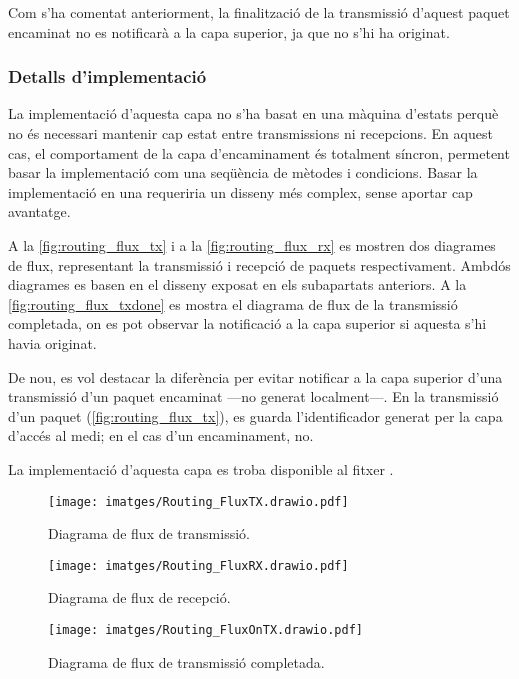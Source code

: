 \documentclass{tfgitic}[2024/07/01]
\begin{document}
{Com s'ha comentat anteriorment, la finalització de la transmissió d'aquest paquet encaminat no es notificarà a la capa superior, ja que no s'hi ha originat.
\subsubsection{Detalls d'implementació}
La implementació d’aquesta capa no s’ha basat en una màquina d’estats perquè no és necessari mantenir cap estat entre transmissions ni recepcions. En aquest cas, el comportament de la capa d’encaminament és totalment síncron, permetent basar la implementació com una seqüència de mètodes i condicions. Basar la implementació en una  requeriria un disseny més complex, sense aportar cap avantatge. 
 
A la \autoref{fig:routing_flux_tx} i a la \autoref{fig:routing_flux_rx} es mostren dos diagrames de flux, representant la transmissió i recepció de paquets respectivament. Ambdós diagrames es basen en el disseny exposat en els subapartats anteriors. A la \autoref{fig:routing_flux_txdone} es mostra el diagrama de flux de la transmissió completada, on es pot observar la notificació a la capa superior si aquesta s'hi havia originat. 

De nou, es vol destacar la diferència per evitar notificar a la capa superior d'una transmissió d'un paquet encaminat ---no generat localment---. En la transmissió d'un paquet (\autoref{fig:routing_flux_tx}), es guarda l'identificador generat per la capa d'accés al medi; en el cas d'un encaminament, no.

La implementació d'aquesta capa es troba disponible al fitxer .

\begin{figure}
    \centering
        \texttt{[image: imatges/Routing\_FluxTX.drawio.pdf]}
    \caption{Diagrama de flux de transmissió.}
    \label{fig:routing_flux_tx}
\end{figure}

\begin{figure}
    \centering
        \texttt{[image: imatges/Routing\_FluxRX.drawio.pdf]}
    \caption{Diagrama de flux de recepció.}
    \label{fig:routing_flux_rx}
\end{figure}

\begin{figure}
    \centering
        \texttt{[image: imatges/Routing\_FluxOnTX.drawio.pdf]}
    \caption{Diagrama de flux de transmissió completada.}
    \label{fig:routing_flux_txdone}
\end{figure}

}
\end{document}

